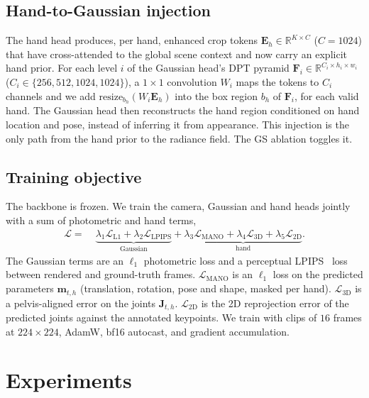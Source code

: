 \documentclass[10pt,twocolumn,letterpaper]{article}
\begin{document}
\subsection{Hand-to-Gaussian injection}
\label{sec:inject}
The hand head produces, per hand, enhanced crop tokens
$\mathbf{E}_h\in\mathbb{R}^{K\times C}$ ($C{=}1024$) that have cross-attended to
the global scene context and now carry an explicit hand prior. For each level $i$
of the Gaussian head's DPT pyramid $\mathbf{F}_i\in\mathbb{R}^{C_i\times h_i\times
w_i}$ ($C_i\in\{256,512,1024,1024\}$), a $1{\times}1$ convolution $W_i$ maps the
tokens to $C_i$ channels and we add $\mathrm{resize}_{b_h}(W_i\mathbf{E}_h)$ into
the box region $b_h$ of $\mathbf{F}_i$, for each valid hand. The Gaussian head
then reconstructs the hand region conditioned on hand location and pose, instead
of inferring it from appearance. This injection is the only path from the hand
prior to the radiance field. The GS ablation toggles it.

\subsection{Training objective}
\label{sec:loss}
The backbone is frozen. We train the camera, Gaussian and hand heads jointly with
a sum of photometric and hand terms,
\begin{equation}
  \begin{aligned}
  \mathcal{L} =\;& \underbrace{\lambda_1 \mathcal{L}_{\mathrm{L1}} + \lambda_2 \mathcal{L}_{\mathrm{LPIPS}}}_{\text{Gaussian}}
  + \underbrace{\lambda_3 \mathcal{L}_{\mathrm{MANO}} + \lambda_4\mathcal{L}_{3\mathrm{D}} + \lambda_5\mathcal{L}_{2\mathrm{D}}}_{\text{hand}} .
  \end{aligned}
  \label{eq:loss}
\end{equation}
The Gaussian terms are an $\ell_1$ photometric loss and a perceptual
LPIPS~\cite{zhang2018lpips} loss between rendered and ground-truth frames.
$\mathcal{L}_{\mathrm{MANO}}$ is an $\ell_1$ loss on the predicted parameters
$\mathbf{m}_{t,h}$ (translation, rotation, pose and shape, masked per hand).
$\mathcal{L}_{3\mathrm{D}}$ is a pelvis-aligned error on the joints
$\mathbf{J}_{t,h}$. $\mathcal{L}_{2\mathrm{D}}$ is the 2D reprojection error of the
predicted joints against the annotated keypoints. We train with clips of $16$
frames at $224{\times}224$, AdamW, bf16 autocast, and gradient accumulation.

\section{Experiments}
\label{sec:exp}
\end{document}

